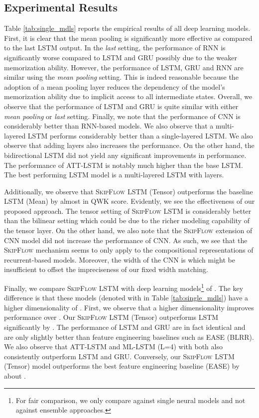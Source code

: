 \documentclass[letterpaper]{article}
\begin{document}
\subsection{Experimental Results}
Table \ref{tab:single_mdls} reports the empirical results of all deep learning models. First, it is clear that the mean pooling is significantly more effective as compared to the last LSTM output. In the \textit{last} setting, the performance of RNN is significantly worse compared to LSTM and GRU possibly due to the weaker memorization ability. However, the performance of LSTM, GRU and RNN are similar using the \textit{mean pooling} setting.  This is indeed reasonable because the adoption of a mean pooling layer reduces the dependency of the model's memorization ability due to implicit access to all intermediate states. Overall, we observe that the performance of LSTM and GRU is quite similar with either \textit{mean pooling} or \textit{last} setting. Finally, we note that the performance of CNN is considerably better than RNN-based models. We also observe that a multi-layered LSTM performs considerably better than a single-layered LSTM. We also observe that adding layers also increases the performance. On the other hand, the bidirectional LSTM did not yield any significant improvements in performance. The performance of ATT-LSTM is notably much higher than the base LSTM. The best performing LSTM model is a multi-layered LSTM with  layers. 

Additionally, we observe that \textsc{SkipFlow} LSTM (Tensor) outperforms the baseline LSTM (Mean) by almost  in QWK score. Evidently, we see the effectiveness of our proposed approach. The tensor setting of \textsc{SkipFlow} LSTM is considerably better than the bilinear setting which could be due to the richer modeling capability of the tensor layer. On the other hand, we also note that the \textsc{SkipFlow} extension of CNN model did not increase the performance of CNN. As such, we see that the \textsc{SkipFlow} mechanism seems to only apply to the compositional representations of recurrent-based models. Moreover, the width of the CNN is  which might be insufficient to offset the impreciseness of our fixed width matching. 

Finally, we compare \textsc{SkipFlow} LSTM with deep learning models\footnote{For fair comparison, we only compare against single neural models and not against ensemble approaches.} of \cite{DBLP:conf/emnlp/TaghipourN16}. The key difference is that these models (denoted with  in Table \ref{tab:single_mdls}) have a higher dimensionality of . First, we observe that a higher dimensionality improves performance over . Our \textsc{SkipFlow} LSTM (Tensor) outperforms LSTM significantly by . The performance of LSTM and GRU are in fact identical and are only slightly better than feature engineering baselines such as EASE (BLRR). We also observe that ATT-LSTM and ML-LSTM (L=4) with both  also consistently outperform LSTM and GRU. Conversely, our \textsc{SkipFlow} LSTM (Tensor) model outperforms the best feature engineering baseline (EASE) by about . 
\end{document}
